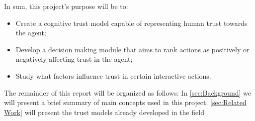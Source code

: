 
In sum, this project's purpose will be to:
\begin{itemize}
	\item Create a cognitive trust model capable of representing human trust towards the agent;
	\item Develop a decision making module that aims to rank actions as positively or negatively affecting trust in the agent;
	\item Study what factors influence trust in certain interactive actions.
\end{itemize}


The remainder of this report will be organized as follows: In \ref{sec:Background} we will present a brief summary of main concepts used in this project. \ref{sec:Related Work} will present the trust models already developed in the field


